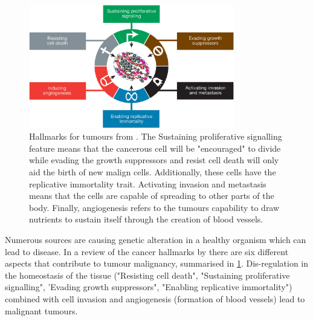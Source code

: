 \begin{figure}[!htb]
  \centering\includegraphics[width=0.8\textwidth,height=0.8\textheight,keepaspectratio]{Sections/Lit_review/Resources/tumour_causes.jpeg}
    \caption{Hallmarks for tumours from \citet{Hanahan2011-px}. The Sustaining proliferative signalling feature means that the cancerous cell will be "encouraged" to divide while evading the growth suppressors and resist cell death will only aid the birth of new malign cells. Additionally, these cells have the replicative immortality trait. Activating invasion and metastasis means that the cells are capable of spreading to other parts of the body. Finally, angiogenesis refers to the tumours capability to draw nutrients to sustain itself through the creation of blood vessels. }
    \label{fig:hallmarks_cancer}
\end{figure}


Numerous sources are causing genetic alteration in a healthy organism which can lead to disease. In a review of the cancer hallmarks by \citealp{Hanahan2011-px} there are six different aspects that contribute to tumour malignancy, summarised in \cref{fig:hallmarks_cancer}.  Dis-regulation in the homeostasis of the tissue ("Resisting cell death",  "Sustaining proliferative signalling", 'Evading growth suppressors", "Enabling replicative immortality") combined with cell invasion and angiogenesis (formation of blood vessels) lead to malignant tumours. 

